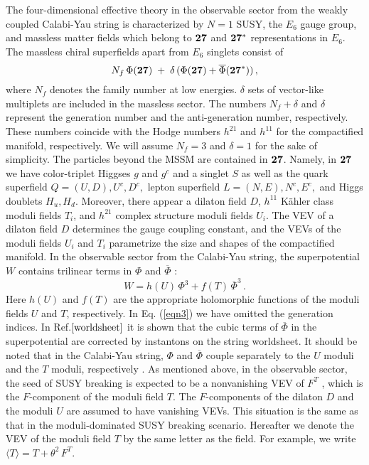 The four-dimensional effective theory in the observable sector 
from the weakly coupled  Calabi-Yau string is characterized by 
$N=1$ SUSY, the $E_{6}$ gauge group, and massless matter fields
which belong to $\bf 27$ and $\bf 27^{\ast}$ representations in $E_{6}$. 
The massless chiral superfields apart from $E_{6}$ singlets 
consist of
\begin{equation}
   N_{f}\,\Phi({\bf 27})\; + 
     \;\delta\,(\Phi({\bf 27}) + {\overline \Phi}({\bf 27}^{\ast})) \,, 
\label{eqn2}
\end{equation}
where $N_{f}$ denotes the family number at low energies. 
$\delta$ sets of vector-like multiplets are included in 
the massless sector. 
The numbers $N_f + \delta$ and $\delta$ represent the generation number and 
the anti-generation number, respectively. 
These numbers coincide with the Hodge numbers $h^{21}$ and 
$h^{11}$ for the compactified manifold, respectively. 
We will assume $N_f = 3$ and $\delta = 1$ for the sake of simplicity. 
The particles beyond the MSSM are contained in ${\bf 27}$. 
Namely, in ${\bf 27}$ we have color-triplet Higgses $g$ and $g^{c}$ and 
a singlet $S$ as well as the quark superfield $Q=(U,D),U^{c},D^{c},$ 
lepton superfield $L=(N,E),N^{c},E^{c},$ and 
Higgs doublets $H_{u},H_{d}$. 
Moreover, there appear a dilaton field $D$, 
$h^{11}$ K\"ahler class moduli fields $T_{i}$, 
and $h^{21}$ complex structure moduli fields $U_{i}$. 
The VEV of a dilaton field $D$ determines the gauge 
coupling constant, and the VEVs of the moduli fields $U_{i}$ and $T_{i}$ 
parametrize the size and shapes of the compactified manifold. 
In the observable sector from the Calabi-Yau string, 
the superpotential $W$ contains trilinear terms 
in $\Phi $ and ${\overline \Phi}$ :
\begin{equation}
    W = h(U) \, \Phi^{3} + f(T) \, \overline{\Phi}^{3} \,.
\label{eqn3}
\end{equation}
Here $h(U)$ and $f(T)$ are the appropriate holomorphic functions of 
the moduli fields $U$ and $T$, respectively. 
In Eq. (\ref{eqn3}) we have omitted the generation indices. 
In Ref.$\cite{worldsheet}$ it is shown that 
the cubic terms of ${\overline \Phi}$ 
in the superpotential are corrected by instantons 
on the string worldsheet. 
It should be noted that in the Calabi-Yau string, 
$\Phi$ and ${\overline \Phi}$ 
couple separately to the $U$ moduli and the $T$ moduli, respectively
\cite{27}. 
As mentioned above, in the observable sector, the seed of SUSY breaking 
is expected to be a nonvanishing VEV of $F^{T}$
\cite{FTdomi}, 
which is the $F$-component of the moduli field $T$. 
The $F$-components of the dilaton $D$ and the moduli $U$
are assumed to have vanishing VEVs. 
This situation is the same as that in the moduli-dominated SUSY breaking 
scenario\cite{modulibreak}. 
Hereafter we denote the VEV of the moduli field $T$ by the same 
letter as the field. 
For example, we write 
$\langle T \rangle = T + \theta^{2}\,F^{T}$. 

